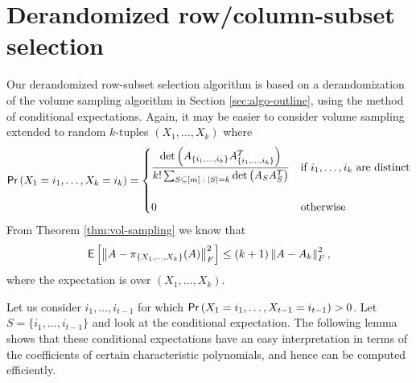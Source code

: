 \documentclass[11pt]{article}
\def\suchthat{\;:\;}
\newcommand{\deter}[1]{\operatorname{det}\left(#1\right)}
\newcommand{\frob}[1]{\left\|#1\right\|_{F}}
\newcommand{\prob}[1]{{\sf Pr} \left(#1\right)}
\newcommand{\expec}[1]{{\sf E} \left[#1\right]}
\newcommand{\size}[1]{\left|#1\right|}
\begin{document}
\section{Derandomized row/column-subset selection} \label{sec:derand}
Our derandomized row-subset selection algorithm is based on a derandomization of the volume sampling algorithm in Section \ref{sec:algo-outline}, using the method of conditional expectations. Again, it may be easier to consider volume sampling extended to random $k$-tuples $(X_{1}, \dotsc, X_{k})$ where
\[
\prob{X_{1} = i_{1}, \dotsc, X_{k} = i_{k}} = \begin{cases} \dfrac{\deter{A_{\{i_{1}, \dotsc, i_{k}\}} A_{\{i_{1}, \dotsc, i_{k}\}}^{T}}}{k! \sum_{S \subseteq [m] \suchthat \size{S}=k} \deter{A_{S} A_{S}^{T}}} & \text{if $i_{1}, \dotsc, i_{k}$ are distinct} \\ \quad & \quad \\ 0 & \text{otherwise} \end{cases}
\]
From Theorem \ref{thm:vol-sampling} we know that
\[
\expec{\frob{A - \pi_{\{X_{1}, \dotsc, X_{k}\}}(A)}^{2}} \leq (k+1) \frob{A - A_{k}}^{2},
\]
where the expectation is over $(X_{1}, \dotsc, X_{k})$.

Let us consider $i_{1}, \dotsc, i_{t-1}$ for which $\prob{X_{1} = i_{1}, \dotsc, X_{t-1} = i_{t-1}} > 0$. Let $S = \{i_{1}, \dotsc, i_{t-1}\}$ and look at the conditional expectation. The following lemma shows that these conditional expectations have an easy interpretation in terms of the coefficients of certain characteristic polynomials, and hence can be computed efficiently.
\end{document}
